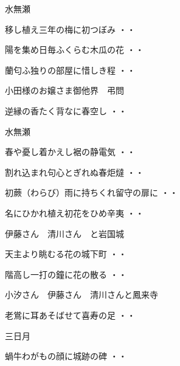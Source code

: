 \vspace{0.6cm}
水無瀬
\begin{shiika}移し植え三年の梅に初つぼみ
\hfill{・・}\end{shiika}
\begin{shiika}陽を集め日毎ふくらむ木瓜の花
\hfill{・・}\end{shiika}
\begin{shiika}蘭匂ふ独りの部屋に惜しき程
\hfill{・・}\end{shiika}
\vspace{0.6cm}
小田様のお嬢さま御他界　弔問
\begin{shiika}逆縁の香たく背なに春空し
\hfill{・・}\end{shiika}
\vspace{0.6cm}
水無瀬
\begin{shiika}春や憂し着かえし裾の静電気
\hfill{・・}\end{shiika}
\begin{shiika}割れ込まれ句心とぎれぬ春炬燵
\hfill{・・}\end{shiika}
\begin{shiika}初蕨（わらび）雨に持ちくれ留守の扉に
\hfill{・・}\end{shiika}
\begin{shiika}名にひかれ植え初花をひめ辛夷
\hfill{・・}\end{shiika}
\vspace{0.6cm}
伊藤さん　清川さん　と岩国城
\begin{shiika}天主より眺むる花の城下町
\hfill{・・}\end{shiika}
\begin{shiika}階高し一打の鐘に花の散る
\hfill{・・}\end{shiika}
\vspace{0.6cm}
小汐さん　伊藤さん　清川さんと鳳来寺
\begin{shiika}老鴬に耳あそばせて喜寿の足
\hfill{・・}\end{shiika}
\vspace{0.6cm}
三日月
\begin{shiika}蝸牛わがもの顔に城跡の碑
\hfill{・・}\end{shiika}
